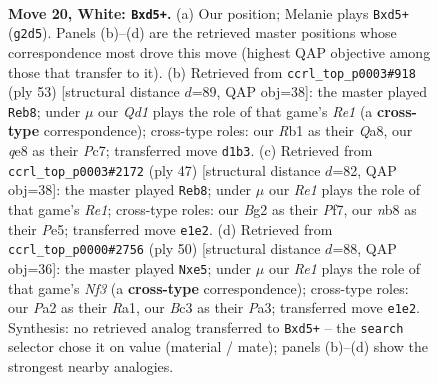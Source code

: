\documentclass[11pt]{article}
\begin{document}
\clearpage

\begin{figure}[p]\centering
\begin{subfigure}{0.46\textwidth}\centering
\resizebox{\linewidth}{!}{%
\newchessgame
\chessboard[
  setfen={rnb1q1k1/1p2r1pp/5n2/p2pNp2/8/2B1P1P1/P4PBP/1R1QR1K1 w - - 2 20},
  showmover=false,
  pgfstyle=straightmove, color=movearrow, markmove={g2-d5}
]}
\caption{}
\end{subfigure}\hfill
\begin{subfigure}{0.46\textwidth}\centering
\resizebox{\linewidth}{!}{%
\newchessgame
\chessboard[
  setfen={q3r1k1/2pb1pp1/1r1b3p/4p3/P6P/2N2PP1/PBQPPRK1/2R5 b - - 4 27},
  showmover=false,
  pgfstyle=straightmove, color=movearrow, markmove={e8-b8}
]}
\caption{}
\end{subfigure}
\\[4pt]
\begin{subfigure}{0.46\textwidth}\centering
\resizebox{\linewidth}{!}{%
\newchessgame
\chessboard[
  setfen={r3r1k1/1q3pp1/2bp3p/2p1p3/2PnP3/P1NB1PP1/RP4P1/3QR1K1 b - - 0 24},
  showmover=false,
  pgfstyle=straightmove, color=movearrow, markmove={e8-b8}
]}
\caption{}
\end{subfigure}\hfill
\begin{subfigure}{0.46\textwidth}\centering
\resizebox{\linewidth}{!}{%
\newchessgame
\chessboard[
  setfen={5r1k/p1q1rbpp/2p1n3/2p1p3/1P4P1/P4N1P/5PB1/R2QR1K1 w - - 0 26},
  showmover=false,
  pgfstyle=straightmove, color=movearrow, markmove={f3-e5}
]}
\caption{}
\end{subfigure}
\caption{\textbf{Move 20, White: \texttt{Bxd5+}.} (a) Our position; Melanie plays \texttt{Bxd5+} (\texttt{g2d5}). Panels (b)--(d) are the retrieved master positions whose correspondence most drove this move (highest QAP objective among those that transfer to it). (b) Retrieved from \texttt{ccrl\_top\_p0003\#918} (ply 53) [structural distance $d$=89, QAP obj=38]: the master played \texttt{Reb8}; under $\mu$ our \emph{Qd1} plays the role of that game's \emph{Re1} (a \textbf{cross-type} correspondence); cross-type roles: our \emph{R}b1 as their \emph{Q}a8, our \emph{q}e8 as their \emph{P}c7; transferred move \texttt{d1b3}. (c) Retrieved from \texttt{ccrl\_top\_p0003\#2172} (ply 47) [structural distance $d$=82, QAP obj=38]: the master played \texttt{Reb8}; under $\mu$ our \emph{Re1} plays the role of that game's \emph{Re1}; cross-type roles: our \emph{B}g2 as their \emph{P}f7, our \emph{n}b8 as their \emph{P}e5; transferred move \texttt{e1e2}. (d) Retrieved from \texttt{ccrl\_top\_p0000\#2756} (ply 50) [structural distance $d$=88, QAP obj=36]: the master played \texttt{Nxe5}; under $\mu$ our \emph{Re1} plays the role of that game's \emph{Nf3} (a \textbf{cross-type} correspondence); cross-type roles: our \emph{P}a2 as their \emph{R}a1, our \emph{B}c3 as their \emph{P}a3; transferred move \texttt{e1e2}. Synthesis: no retrieved analog transferred to \texttt{Bxd5+} -- the \texttt{search} selector chose it on value (material / mate); panels (b)--(d) show the strongest nearby analogies.}
\label{fig:thought-m38}
\end{figure}
\end{document}
